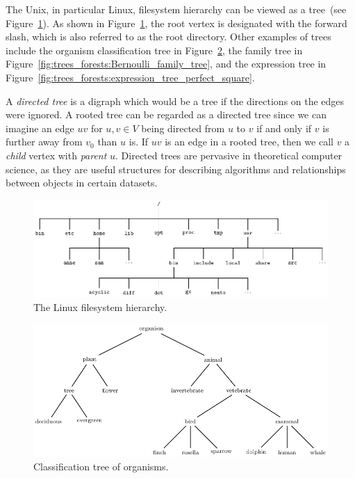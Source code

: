 The Unix, in particular Linux,
filesystem hierarchy
can be viewed as a tree~(see
Figure~\ref{fig:trees_forests:filesystem_hierarchy}). As shown in
Figure~\ref{fig:trees_forests:filesystem_hierarchy}, the
root vertex is designated with the forward slash,
which is also referred to as the root
directory. Other examples of trees include the
organism classification tree in
Figure~\ref{fig:trees_forests:classification_tree_organisms}, the
family tree in
Figure~\ref{fig:trees_forests:Bernoulli_family_tree}, and the
expression tree in
Figure~\ref{fig:trees_forests:expression_tree_perfect_square}.

A \emph{directed tree} is a
digraph which would be a tree if the directions on the
edges were ignored. A rooted tree can be regarded
as a directed tree since we can imagine an edge
$uv$ for $u,v \in V$ being directed from $u$ to $v$ if and only if $v$ is
further away from $v_0$ than $u$ is. If $uv$ is an edge in a
rooted tree, then we call $v$ a
\emph{child} vertex with
\emph{parent} $u$. Directed
trees are pervasive in theoretical computer science, as they are
useful structures for describing algorithms and relationships between
objects in certain datasets.

\begin{figure}[!htbp]
\centering
{}
\includegraphics{image/trees-forests/filesystem-hierarchy}
\caption{The Linux filesystem hierarchy.}
\label{fig:trees_forests:filesystem_hierarchy}
\end{figure}

\begin{figure}[!htbp]
\centering
{}
\includegraphics{image/trees-forests/classification-tree-organisms}
\caption{Classification tree of organisms.}
\label{fig:trees_forests:classification_tree_organisms}
\end{figure}

